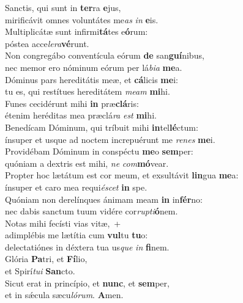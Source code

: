 \evenverse Sanctis, qui sunt in \textbf{ter}ra \textbf{e}jus,~\*\\
\evenverse mirificávit omnes voluntátes me\textit{as} \textit{in} \textbf{e}is.\\
\oddverse Multiplicátæ sunt infirmi\textbf{tá}tes e\textbf{ó}rum:~\*\\
\oddverse póstea acce\textit{le}\textit{ra}\textbf{vé}runt.\\
\evenverse Non congregábo conventícula eórum \textbf{de} san\textbf{guí}nibus,~\*\\
\evenverse nec memor ero nóminum eórum per lá\textit{bi}\textit{a} \textbf{me}a.\\
\oddverse Dóminus pars hereditátis meæ, et \textbf{cá}licis \textbf{me}i:~\*\\
\oddverse tu es, qui restítues hereditátem \textit{me}\textit{am} \textbf{mi}hi.\\
\evenverse Funes cecidérunt mihi \textbf{in} præ\textbf{clá}ris:~\*\\
\evenverse étenim heréditas mea præclá\textit{ra} \textit{est} \textbf{mi}hi.\\
\oddverse Benedícam Dóminum, qui tríbuit mihi \textbf{in}tel\textbf{lé}ctum:~\*\\
\oddverse ínsuper et usque ad noctem increpuérunt me \textit{re}\textit{nes} \textbf{me}i.\\
\evenverse Providébam Dóminum in conspéctu \textbf{me}o \textbf{sem}per:~\*\\
\evenverse quóniam a dextris est mihi, \textit{ne} \textit{com}\textbf{mó}vear.\\
\oddverse Propter hoc lætátum est cor meum, et exsultávit \textbf{lin}gua \textbf{me}a:~\*\\
\oddverse ínsuper et caro mea requi\textit{é}\textit{scet} \textbf{in} spe.\\
\evenverse Quóniam non derelínques ánimam meam \textbf{in} in\textbf{fér}no:~\*\\
\evenverse nec dabis sanctum tuum vidére cor\textit{rup}\textit{ti}\textbf{ó}nem.\\
\oddverse Notas mihi fecísti vias vitæ,~+\\
\oddverse  adimplébis me lætítia cum \textbf{vul}tu \textbf{tu}o:~\*\\
\oddverse delectatiónes in déxtera tua us\textit{que} \textit{in} \textbf{fi}nem.\\
\evenverse Glória \textbf{Pa}tri, et \textbf{Fí}lio,~\*\\
\evenverse et Spirí\textit{tu}\textit{i} \textbf{San}cto.\\
\oddverse Sicut erat in princípio, et \textbf{nunc}, et \textbf{sem}per,~\*\\
\oddverse et in sǽcula sæcu\textit{ló}\textit{rum}. \textbf{A}men.\\
